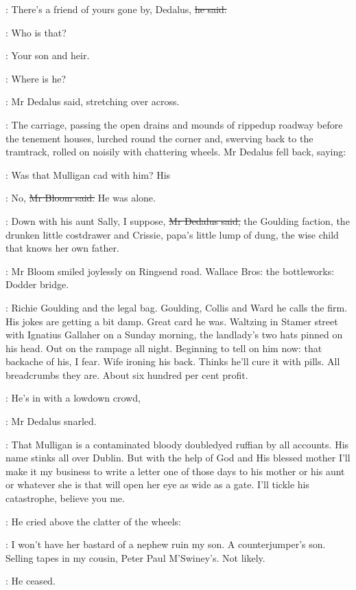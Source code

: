 \Bloom:
There's a friend of yours gone by, Dedalus,
\sout{he said.}

\simon:
Who is that?

\Bloom:
Your son and heir.

\simon:
Where is he?

:
Mr Dedalus said,
stretching over across.

:
The carriage, passing the open drains and mounds of rippedup roadway
before the tenement houses,
lurched round the corner
and, swerving back to the tramtrack, rolled on noisily with chattering wheels.
Mr Dedalus fell back, saying:

\simon:
Was that Mulligan cad with him?
His 

\Bloom:
No,
\sout{Mr Bloom said.}
He was alone.

\simon:
Down with his aunt Sally, I suppose,
\sout{Mr Dedalus said,}
the Goulding faction,
the drunken little costdrawer
and Crissie, papa's little lump of dung,
the wise child that knows her own father.

:
Mr Bloom smiled joylessly on Ringsend road.
Wallace Bros:
the bottleworks:
Dodder bridge.

\BloomInt:
Richie Goulding and the legal bag.
Goulding, Collis and Ward he calls the firm.
His jokes are getting a bit damp.
Great card he was.
Waltzing in Stamer street with Ignatius Gallaher on a Sunday morning,
the landlady's two hats pinned on his head.
Out on the rampage all night.
Beginning to tell on him now:
that backache of his, I fear.
Wife ironing his back.
Thinks he'll cure it with pills.
All breadcrumbs they are.
About six hundred per cent profit.

\simon:
He's in with a lowdown crowd,

:
Mr Dedalus snarled.

\simon:
That Mulligan is a contaminated bloody doubledyed ruffian by all accounts.
His name stinks all over Dublin.
But with the help of God and His blessed mother
I'll make it my business to write a letter
one of those days
to his mother or his aunt or whatever she is
that will open her eye as wide as a gate.
I'll tickle his catastrophe, believe you me.

:
He cried above the clatter of the wheels:

\simon:
I won't have her bastard of a nephew ruin my son.
A counterjumper's son.
Selling tapes in my cousin, Peter Paul M'Swiney's.
Not likely.

:
He ceased.

